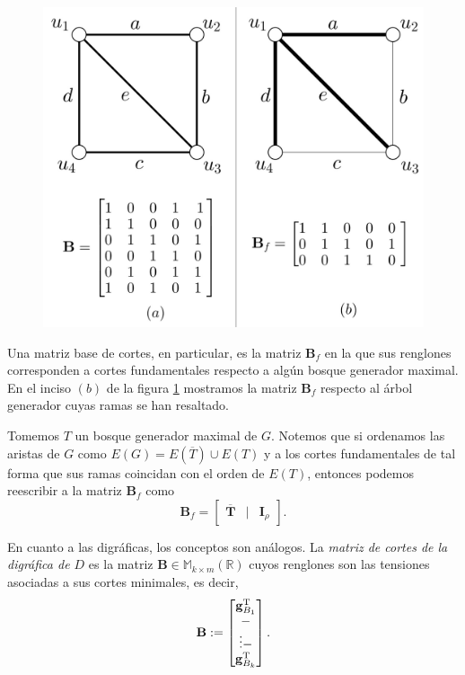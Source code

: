 \begin{figure}[H]
    \centering
    \includegraphics[scale=0.25]{img/imgchapter4/matrizdecortes.jpg}
    \caption{}
    \label{fig:matrizdecortes}
\end{figure}

Una matriz base de cortes, en particular, es la matriz $\mathbf{B}_{f}$ en la que sus renglones corresponden a cortes fundamentales respecto a algún bosque generador maximal. En el inciso $(b)$ de la figura \ref{fig:matrizdecortes} mostramos la matriz $\mathbf{B}_{f}$ respecto al árbol generador cuyas ramas se han resaltado.


Tomemos $T$ un bosque generador maximal de $G$. Notemos que si ordenamos las aristas de $G$ como $E(G) = E(\overline{T}) \cup E(T)$ y a los cortes fundamentales de tal forma que sus ramas coincidan con el orden de $E(T)$, entonces podemos reescribir a la matriz $\mathbf{B}_{f}$ como
$$
\mathbf{B}_{f} = \begin{bmatrix}
\mathbf{\overline{T}} & | & \mathbf{I}_{\rho}
\end{bmatrix}.
$$

En cuanto a las digráficas, los conceptos son análogos. La \textit{matriz de cortes de la digráfica de $D$} es la matriz $\mathbf{B} \in \mathbb{M}_{k\times m}(\mathbb{R})$ cuyos renglones son las tensiones asociadas a sus cortes minimales, es decir, $$ 
\mathbf{B}:= \begin{bmatrix} 
\mathbf{g}_{B_{1}}^{\textnormal{T}} \\
\-- \\
\vdots
\-- \\
\mathbf{g}_{B_{k}}^{\textnormal{T}}
\end{bmatrix}.
$$

